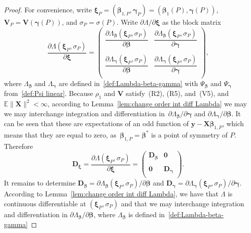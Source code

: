 \documentclass{article}
\numberwithin{equation}{section}
\theoremstyle{plain}
\newcommand{\bbeta}{\bm\beta}
\newcommand{\bxi}{\bm\xi}
\newcommand{\bgamma}{\bm\gamma}
\newcommand{\by}{\mathbf{y}}
\newcommand{\bX}{\mathbf{X}}
\newcommand{\bV}{\mathbf{V}}
\newcommand{\bD}{\mathbf{D}}
\newcommand{\E}{\mathbb{E}}
\begin{document}
\begin{proof}
For convenience, write $\bxi_P=(\bbeta_{1,P},\bgamma_P)=(\bbeta_1(P),\bgamma(P))$,
$\bV_P=\bV(\bgamma(P))$, and $\sigma_P=\sigma(P)$.
Write $\partial \Lambda/\partial\bxi$ as the block matrix
\begin{equation}
\label{def:Lambda derivative}
\frac{\partial \Lambda(\bxi_P,\sigma_P)}{\partial \bxi}
=
\left(
  \begin{array}{cc}
\dfrac{\partial \Lambda_{\bbeta}(\bxi_P,\sigma_P)}{\partial \bbeta} & \dfrac{\partial \Lambda_{\bbeta}(\bxi_P,\sigma_P)}{\partial \bgamma} \\
    \\
\dfrac{\partial \Lambda_{\bgamma}(\bxi_P,\sigma_P)}{\partial \bbeta} & \dfrac{\partial \Lambda_{\bgamma}(\bxi_P,\sigma_P)}{\partial \bgamma} \\
  \end{array}
\right),
\end{equation}
where $\Lambda_{\bbeta}$ and $\Lambda_{\bgamma}$ are defined in~\eqref{def:Lambda-beta-gamma}
with $\Psi_{\bbeta}$ and $\Psi_{\bgamma}$ from~\eqref{def:Psi linear}.
Because $\rho_1$ and $\bV$ satisfy~(R2), (R5), and~(V5), and $\E\|\bX\|^2<\infty$,
according to Lemma~\ref{lem:change order int diff Lambda} we may
we may interchange integration and differentiation  
in~$\partial\Lambda_{\bbeta}/\partial\bgamma$ and $\partial\Lambda_{\bgamma}/\partial\bbeta$.
It can be seen that these are expectations of an odd function of $\by-\bX\bbeta_{1,P}$,
which means that they are equal to zero, as~$\bbeta_{1,P}=\bbeta^*$ is a point of symmetry of $P$.
Therefore
\begin{equation}
\label{eq:block matrix}
\bD_{\bxi}
=
\frac{\partial \Lambda(\bxi_P,\sigma_P)}{\partial \bxi}
=
\left(
  \begin{array}{cc}
\bD_{\bbeta} & \mathbf{0} \\
    \\
\mathbf{0} & \bD_{\bgamma} \\
  \end{array}
\right).
\end{equation}
It remains to determine $\bD_{\bbeta}=\partial\Lambda_{\bbeta}(\bxi_P,\sigma_P)/\partial\bbeta$
and $\bD_{\bgamma}=\partial\Lambda_{\bgamma}(\bxi_P,\sigma_P)/\partial\bgamma$.
According to Lemma~\ref{lem:change order int diff Lambda}, we have that $\Lambda$ is continuous differentiable at $(\bxi_P,\sigma_P)$ and
that we may interchange
integration and differentiation in $\partial\Lambda_{\bbeta}/\partial\bbeta$, where $\Lambda_{\bbeta}$ is defined in~\eqref{def:Lambda-beta-gamma}

\end{proof}
\end{document}
